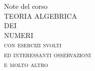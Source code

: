 {\thispagestyle{empty}\centering
\vspace{1\textheight}
{\large Note del corso}\\[\baselineskip]
{\Huge TEORIA ALGEBRICA}\\[\baselineskip]
{\Large DEI}\\[\baselineskip]
{\Huge NUMERI}\\[\baselineskip]
{\scshape con esercizi svolti}\\
{\scshape ed interessanti osservazioni}\\
{\large\scshape e molto altro}\\
\vfill\null}

